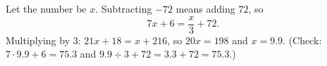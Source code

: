 Let the number be $x$. Subtracting $-72$ means adding $72$, so
\[7x+6=\dfrac x3+72.\]
Multiplying by $3$: $21x+18=x+216$, so $20x=198$ and $x=\boxed{9.9}$. (Check: $7\cdot9.9+6=75.3$ and $9.9\div3+72=3.3+72=75.3$.)
